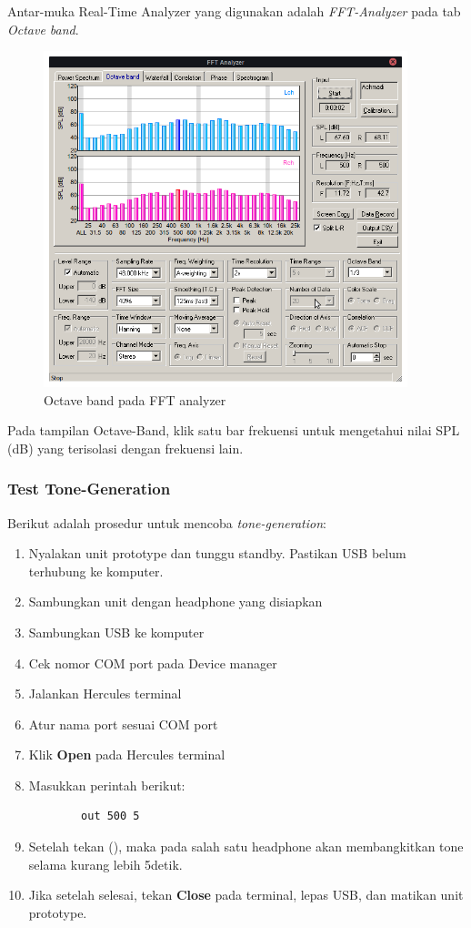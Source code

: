 \documentclass[12pt,]{article}
\begin{document}
	Antar-muka Real-Time Analyzer yang digunakan adalah \textit{FFT-Analyzer} pada tab \textit{Octave band}.
	
	\begin{figure}[!ht]
		\centering
		\includegraphics[width=300pt]{images/kemar/fft}
		\caption{Octave band pada FFT analyzer}
	\end{figure}
	
	Pada tampilan Octave-Band, klik satu bar frekuensi untuk mengetahui nilai SPL (dB)
	yang terisolasi dengan frekuensi lain.
	
	\newpage
	\subsubsection{Test Tone-Generation}
	Berikut adalah prosedur untuk mencoba \textit{tone-generation}:
	\begin{enumerate}
		\item Nyalakan unit prototype dan tunggu standby.
		Pastikan USB belum terhubung ke komputer.
		\item Sambungkan unit dengan headphone yang disiapkan
		\item Sambungkan USB ke komputer
		\item Cek nomor COM port pada Device manager
		\item Jalankan Hercules terminal
		\item Atur nama port sesuai COM port
		\item Klik \textbf{Open} pada Hercules terminal
		\item Masukkan perintah berikut:
		\begin{verbatim}
		out 500 5
		\end{verbatim}
		\item Setelah tekan (\keys{\return}), maka pada salah satu headphone
		akan membangkitkan tone selama kurang lebih 5detik.
		\item Jika setelah selesai, tekan \textbf{Close} pada terminal,
		lepas USB, dan matikan unit prototype.
		
	\end{enumerate}
	
\end{document}
